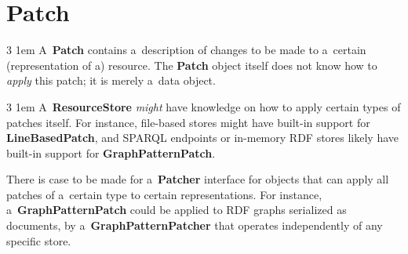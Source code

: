 \documentclass[10pt]{article}
\newcommand\component[1]{\mbox{\bf #1}}
\newenvironment{Note}
  {\begin{multicols}{3}%
     \parskip 1em}
  {\end{multicols}}
\begin{document}
\clearpage

\section*{Patch}
\begin{Note}
A~\component{Patch} contains a~description
of changes to be made to a~certain
(representation of a) resource.
The \component{Patch} object itself
does not know how to \emph{apply} this patch;
it is merely a~data object.
\columnbreak

\null
\columnbreak

\null
\end{Note}

\bigskip


\begin{Note}
A~\component{ResourceStore} \emph{might} have knowledge
on how to apply certain types of patches itself.
For instance, file-based stores
might have built-in support for \component{LineBasedPatch},
and SPARQL endpoints or in-memory RDF stores
likely have built-in support for \component{GraphPatternPatch}.
\columnbreak

There is case to be made for a~\component{Patcher} interface
for objects that can apply all patches of a~certain type
to certain representations.
For instance,
a~\component{GraphPatternPatch} could be applied
to RDF graphs serialized as documents,
by a~\component{GraphPatternPatcher}
that operates independently of any specific store.

\columnbreak

\null
\end{Note}
\end{document}
